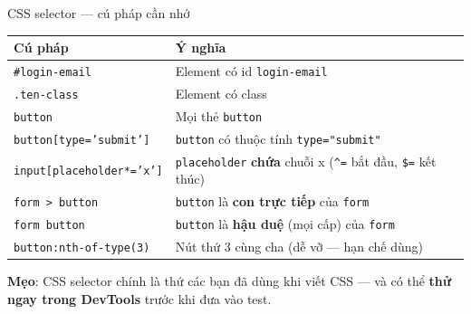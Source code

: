 \documentclass[aspectratio=169,12pt]{beamer}
\begin{document}
\begin{frame}{CSS selector --- cú pháp cần nhớ}
  \begin{center}
  \footnotesize
  \renewcommand{\arraystretch}{0.92}
  \setlength{\tabcolsep}{4pt}
  \begin{tabular}{>{\raggedright\arraybackslash}p{5.4cm}>{\raggedright\arraybackslash}p{6.6cm}}
    \toprule
    \textbf{Cú pháp} & \textbf{Ý nghĩa} \\
    \midrule
    \texttt{\#login-email} & Element có id \texttt{login-email} \\
    \texttt{.ten-class} & Element có class \\
    \texttt{button} & Mọi thẻ \texttt{button} \\
    \texttt{button[type='submit']} & \texttt{button} có thuộc tính \texttt{type="submit"} \\
    \texttt{input[placeholder*='x']} & \texttt{placeholder} \textbf{chứa} chuỗi x (\texttt{\textasciicircum=} bắt đầu, \texttt{\$=} kết thúc) \\
    \texttt{form > button} & \texttt{button} là \textbf{con trực tiếp} của \texttt{form} \\
    \texttt{form button} & \texttt{button} là \textbf{hậu duệ} (mọi cấp) của \texttt{form} \\
    \texttt{button:nth-of-type(3)} & Nút thứ 3 cùng cha (dễ vỡ --- hạn chế dùng) \\
    \bottomrule
  \end{tabular}
  \end{center}
  \vspace{-0.4em}

  {\small \textbf{Mẹo}: CSS selector chính là thứ các bạn đã dùng khi viết CSS
  --- và có thể \textbf{thử ngay trong DevTools} trước khi đưa vào test.}
\end{frame}
\end{document}
